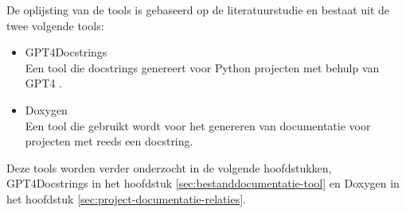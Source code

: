 De oplijsting van de tools is gebaseerd op de literatuurstudie en bestaat uit de twee volgende tools:
\begin{itemize} 
\item GPT4Docstrings \autocite{Trofficus2023}\\
Een tool die docstrings genereert voor Python projecten met behulp van GPT4 \textcite{OpenAI2023}.
\item Doxygen \autocite{Doxygen2023}\\
Een tool die gebruikt wordt voor het genereren van documentatie voor projecten met reeds een docstring.
\end{itemize}

Deze tools worden verder onderzocht in de volgende hoofdstukken, GPT4Docstrings in het hoofdstuk \ref{sec:bestanddocumentatie-tool} en Doxygen in het hoofdstuk \ref{sec:project-documentatie-relaties}.